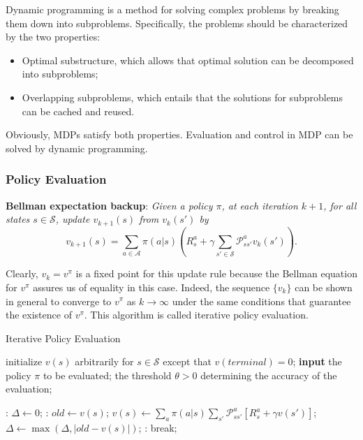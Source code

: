 \documentclass{progartcn}
\begin{document}
		Dynamic programming is a method for solving complex problems by breaking them down into subproblems. Specifically, the problems should be characterized by the two properties:
		\begin{itemize}[noitemsep,topsep=0pt]
			\item Optimal substructure, which allows that optimal solution can be decomposed into subproblems;
			\item Overlapping subproblems, which entails that the solutions for subproblems can be cached and reused.
		\end{itemize}

		Obviously, MDPs satisfy both properties. Evaluation and control in MDP can be solved by dynamic programming.\\

	\subsubsection{Policy Evaluation}

			\textbf{Bellman expectation backup}: \textit{Given a policy $\pi$, at each iteration $k+1$, for all states $s\in \mathcal{S}$, update $v_{k+1}(s)$ from $v_k(s')$ by}
			\[v_{k+1}(s)=\sum_{a\in\mathcal{A}}\pi(a|s)\left(R_s^a+\gamma\sum_{s'\in\mathcal{S}}\mathcal{P}_{ss'}^a v_k(s')\right).\]

			Clearly, $v_k = v^\pi$ is a fixed point for this update rule because the Bellman equation for $v^\pi$ assures us of equality in this case. Indeed, the sequence $\{v_k\}$ can be shown in general to converge to $v^\pi$ as $k\to\infty$ under the same conditions that guarantee the existence of $v^\pi$. This algorithm is called iterative policy evaluation.\\

			\begin{algorithm}[H]
			\caption{Iterative Policy Evaluation}
			\label{alg: Iterative Policy Evaluation}
			\begin{algorithmic}[1]
				\State initialize $v(s)$ arbitrarily for $s\in\mathcal{S}$ except that $v(terminal)=0$;
				\State \textbf{input} the policy $\pi$ to be evaluated; the threshold $\theta>0$ determining the accuracy of the evaluation; 

				:
					\State $\Delta\gets 0$;
					:
						\State $old\gets v(s)$;
						\State $v(s)\gets\sum_{a}\pi(a|s)\sum_{s'}\mathcal{P}_{ss'}^a[R_s^a+\gamma v(s')]$;
						\State $\Delta\gets\max(\Delta,|old-v(s)|)$;
					\EndFor
					\If {$\Delta<\theta$}:
						\State break;
					\EndIf
            	\EndFor
			\end{algorithmic}
			\end{algorithm}
\end{document}
